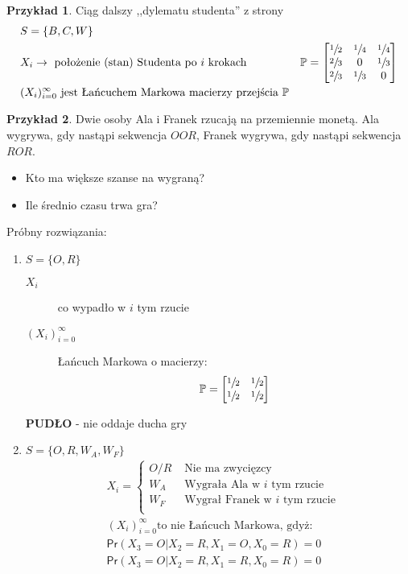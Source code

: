 \documentclass[a4paper,12pt]{article}
\theoremstyle{definition}%
\newtheorem{example}{Przykład}
\newtheorem*{example*}{Przykład} %
\theoremstyle{definition}
\theoremstyle{problem}
\begin{document}
\begin{example*} 
Ciąg dalszy ,,dylematu studenta'' z strony \pageref{exa:student}
\begin{align*}
&S=\{B,C,W\}\\
&X_i \rightarrow \text{ położenie (stan) Studenta po }i\text{ krokach}
&\mathbb{P}=\begin{bmatrix}
\sfrac{1}{2} & \sfrac{1}{4} & \sfrac{1}{4} \\
\sfrac{2}{3} & 0 & \sfrac{1}{3}\\
\sfrac{2}{3} & \sfrac{1}{3} &0 
\end{bmatrix}\\
&(X_i)_{i=0}^\infty \text{ jest Łańcuchem Markowa macierzy przejścia }\mathbb{P}
\end{align*}
\end{example*}
\begin{example*} 
Dwie osoby Ala i Franek rzucają na przemiennie monetą. Ala wygrywa, gdy nastąpi sekwencja $OOR$, Franek wygrywa, gdy nastąpi sekwencja $ROR$. 
\begin{itemize}
\item[] Kto ma większe szanse na wygraną? 
\item[] Ile średnio czasu trwa gra?
\end{itemize}
Próbny rozwiązania:
\begin{enumerate}[label=Próba \Roman*.]
\item $S=\{O,R\}$
\begin{description}
\item[$X_i$] co wypadło w $i$ tym rzucie
\item[$(X_i)_{i=0}^\infty$] Łańcuch Markowa o macierzy:
$$\mathbb{P}=\begin{bmatrix}
\sfrac{1}{2}&\sfrac{1}{2}\\\sfrac{1}{2}&\sfrac{1}{2}
\end{bmatrix}$$
\end{description}
\textbf{PUDŁO} - nie oddaje ducha gry

\item $S=\{O,R,W_A,W_F\}$
\begin{align*}
&X_i=\left\{\begin{matrix}
O/R & \text{ Nie ma zwycięzcy }\\
W_A & \text{ Wygrała Ala w }i\text{ tym rzucie} \\
W_F & \text{ Wygrał Franek w }i\text{ tym rzucie} \\
\end{matrix}
\right.\\
&(X_i)_{i=0}^\infty \text{to nie Łańcuch Markowa, gdyż: }\\
&\mathsf{Pr}(X_3=O|X_2=R,X_1=O,X_0=R)=0\\
&\mathsf{Pr}(X_3=O|X_2=R,X_1=R,X_0=R)=0
\end{align*}


\end{enumerate}
\end{example*}
\end{document}
